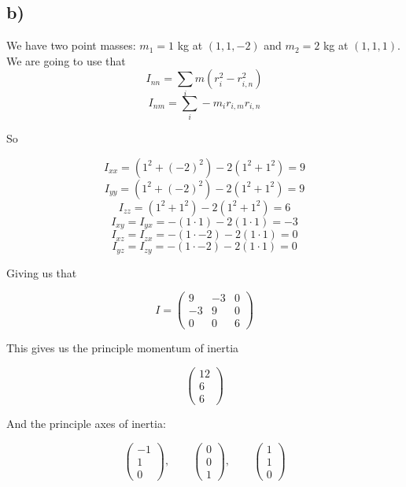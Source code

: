 \documentclass[a4paper,norsk, 10pt]{article}
\begin{document}
\subsection*{b)}
We have two point masses: $m_1 = 1$ kg at $(1,1,-2)$ and $m_2 = 2$ kg at $(1,1,1)$. We are going to use that
$$
I_{nn} = \sum_i m(r_i^2-r_{i,n}^2) 
$$
$$
I_{nm} = \sum_i -m_ir_{i,m}r_{i,n} 
$$

So 

$$
I_{xx} = (1^2 +(-2)^2) - 2(1^2 + 1^2) = 9
$$
$$
I_{yy} = (1^2 +(-2)^2) - 2(1^2 + 1^2) = 9
$$
$$
I_{zz} = (1^2 +1^2) - 2(1^2 + 1^2) = 6 
$$
$$
I_{xy} = I_{yx} = -(1\cdot1) - 2(1\cdot 1) = -3
$$
$$
I_{xz} = I_{zx} = -(1\cdot-2) - 2(1\cdot 1) = 0
$$
$$
I_{yz} = I_{zy} = -(1\cdot-2) - 2(1\cdot 1) = 0
$$

Giving us that

$$
I = 
\begin{pmatrix}
9 & -3 & 0\\
-3 & 9 & 0\\
0&0& 6
\end{pmatrix}
$$

This gives us the principle momentum of inertia

$$
\begin{pmatrix}
12\\6\\6
\end{pmatrix}
$$

And the principle axes of inertia:

$$
\begin{pmatrix}
-1\\
1\\
0
\end{pmatrix}
,\qquad
\begin{pmatrix}
0\\
0\\
1
\end{pmatrix}
,\qquad
\begin{pmatrix}
1\\
1\\
0
\end{pmatrix}
$$
\end{document}
